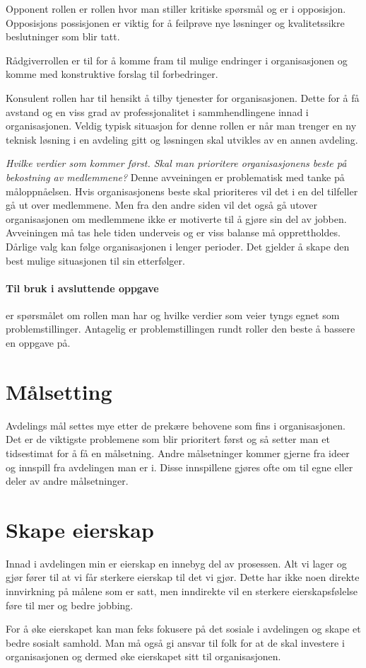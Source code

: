 \documentclass[12pt, a4paper]{article}
\begin{document}
Opponent rollen er rollen hvor man stiller kritiske spørsmål og er i
opposisjon. Opposisjons possisjonen er viktig for å feilprøve nye løsninger og
kvalitetssikre beslutninger som blir tatt. 

Rådgiverrollen er til for å komme fram til mulige endringer i organisasjonen og
komme med konstruktive forslag til forbedringer. 

Konsulent rollen har til hensikt å tilby tjenester for organisasjonen. Dette
for å få avstand og en viss grad av professjonalitet i sammhendlingene innad i
organisasjonen. Veldig typisk situasjon for denne rollen er når man trenger en
ny teknisk løsning i en avdeling gitt og løsningen skal utvikles av en annen
avdeling. 

\textit{Hvilke verdier som kommer først. Skal man prioritere organisasjonens beste på
bekostning av medlemmene?}
Denne avveiningen er problematisk med tanke på måloppnåelsen. Hvis
organisasjonens beste skal prioriteres vil det i en del tilfeller gå ut over
medlemmene. Men fra den andre siden vil det også gå utover organisasjonen om
medlemmene ikke er motiverte til å gjøre sin del av jobben. Avveiningen må tas
hele tiden underveis og er viss balanse må opprettholdes. Dårlige valg kan
følge organisasjonen i lenger perioder. Det gjelder å skape den best mulige
situasjonen til sin etterfølger. 

\paragraph{Til bruk i avsluttende oppgave} er spørsmålet om rollen man har og
hvilke verdier som veier tyngs egnet som problemstillinger. Antagelig er
problemstillingen rundt roller den beste å bassere en oppgave på.  

\section{Målsetting}
Avdelings mål settes mye etter de prekære behovene som fins i organisasjonen.
Det er de viktigste problemene som blir prioritert først og så setter man et
tidsestimat for å få en målsetning. Andre målsetninger kommer gjerne fra ideer
og innspill fra avdelingen man er i. Disse innspillene gjøres ofte om til egne
eller deler av andre målsetninger.  

\section{Skape eierskap}
Innad i avdelingen min er eierskap en innebyg del av prosessen. Alt vi lager og
gjør fører til at vi får sterkere eierskap til det vi gjør. Dette har ikke noen
direkte innvirkning på målene som er satt, men inndirekte vil en sterkere
eierskapsfølelse føre til mer og bedre jobbing. 

For å øke eierskapet kan man feks fokusere på det sosiale i avdelingen og skape
et bedre sosialt samhold. Man må også gi ansvar til folk for at de skal
investere i organisasjonen og dermed øke eierskapet sitt til organisasjonen. 
\end{document}
